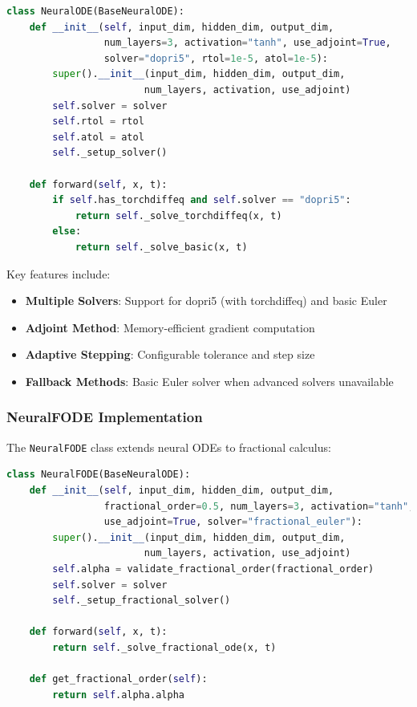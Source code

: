 \begin{lstlisting}[language=Python, caption=NeuralODE Implementation]
class NeuralODE(BaseNeuralODE):
    def __init__(self, input_dim, hidden_dim, output_dim,
                 num_layers=3, activation="tanh", use_adjoint=True,
                 solver="dopri5", rtol=1e-5, atol=1e-5):
        super().__init__(input_dim, hidden_dim, output_dim, 
                        num_layers, activation, use_adjoint)
        self.solver = solver
        self.rtol = rtol
        self.atol = atol
        self._setup_solver()
    
    def forward(self, x, t):
        if self.has_torchdiffeq and self.solver == "dopri5":
            return self._solve_torchdiffeq(x, t)
        else:
            return self._solve_basic(x, t)
\end{lstlisting}

Key features include:
\begin{itemize}
    \item \textbf{Multiple Solvers}: Support for dopri5 (with torchdiffeq) and basic Euler
    \item \textbf{Adjoint Method}: Memory-efficient gradient computation
    \item \textbf{Adaptive Stepping}: Configurable tolerance and step size
    \item \textbf{Fallback Methods}: Basic Euler solver when advanced solvers unavailable
\end{itemize}

\subsubsection{NeuralFODE Implementation}

The \texttt{NeuralFODE} class extends neural ODEs to fractional calculus:

\begin{lstlisting}[language=Python, caption=NeuralFODE Implementation]
class NeuralFODE(BaseNeuralODE):
    def __init__(self, input_dim, hidden_dim, output_dim,
                 fractional_order=0.5, num_layers=3, activation="tanh",
                 use_adjoint=True, solver="fractional_euler"):
        super().__init__(input_dim, hidden_dim, output_dim, 
                        num_layers, activation, use_adjoint)
        self.alpha = validate_fractional_order(fractional_order)
        self.solver = solver
        self._setup_fractional_solver()
    
    def forward(self, x, t):
        return self._solve_fractional_ode(x, t)
    
    def get_fractional_order(self):
        return self.alpha.alpha
\end{lstlisting}

